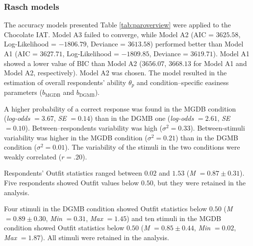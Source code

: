 \documentclass[12pt]{book}
\begin{document}
\subsubsection{Rasch models}\label{sub:chocolateRasch}
The accuracy models presented Table \ref{tab:paroverview} were applied to the Chocolate IAT. 
Model A3 failed to converge, while Model A2 (AIC = $3625.58$, Log-Likelihood = $-1806.79$, Deviance = $3613.58$) performed better than Model A1 (AIC = $3627.71$, Log-Likelihood  = $-1809.85$, Deviance  = $3619.71$). Model A1 showed a lower value of BIC than Model A2 ($3656.07$, $3668.13$ for Model A1 and Model A2, respectively). Model A2 was chosen. The model resulted in the estimation of overall respondents' ability $\theta_p$ and condition--specific easiness parameters ($b_{\text{MGDB}}$ and $b_{\text{DGMB}}$).

A higher probability of a correct response was found in the MGDB condition (\emph{log-odds} $= 3.67$, \emph{SE} $= 0.14$) than in the DGMB one (\emph{log-odds} $= 2.61$, \emph{SE} $= 0.10$). 
Between--respondents variability was high ($\sigma^2 = 0.33$). Between-stimuli variability was higher in the MGDB condition ($\sigma^2 = 0.21$) than in the DGMB condition ($\sigma^2 = 0.01$). The variability of the stimuli in the two conditions were weakly correlated  ($r = .20$). 

Respondents' Outfit statistics ranged between $0.02$ and $1.53$ (\emph{M} $= 0.87 \pm 0.31$). Five respondents showed Outfit values below $0.50$, but they were retained in the analysis.

Four stimuli in the DGMB condition showed Outfit statistics below $0.50$ (\emph{M} $= 0.89\pm 0.30$, \emph{Min} $= 0.31$, \emph{Max} $=
1.45$) and ten stimuli in the MGDB condition showed Outfit statistics below $0.50$ (\emph{M} $= 0.85 \pm 0.44$, \emph{Min} $= 0.02$, \emph{Max} $=
1.87$). All stimuli were retained in the analysis. 
\end{document}
